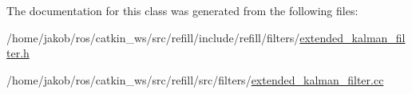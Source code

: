 The documentation for this class was generated from the following files\+:\begin{DoxyCompactItemize}
\item 
/home/jakob/ros/catkin\+\_\+ws/src/refill/include/refill/filters/\hyperlink{extended__kalman__filter_8h}{extended\+\_\+kalman\+\_\+filter.\+h}\item 
/home/jakob/ros/catkin\+\_\+ws/src/refill/src/filters/\hyperlink{extended__kalman__filter_8cc}{extended\+\_\+kalman\+\_\+filter.\+cc}\end{DoxyCompactItemize}

